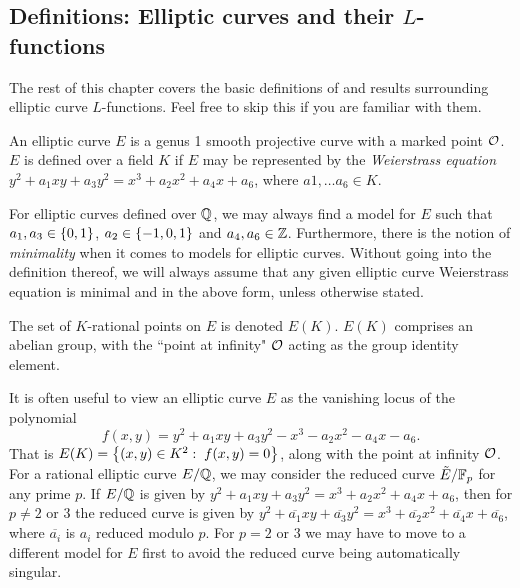 \documentclass[10pt]{article}
\begin{document}
\subsection{Definitions: Elliptic curves and their $L$-functions}

The rest of this chapter covers the basic definitions of and results surrounding elliptic curve $L$-functions. Feel free to skip this if you are familiar with them.

\begin{definition}
An elliptic curve $E$ is a genus 1 smooth projective curve with a marked point $\mathcal{O}$. $E$ is defined over a field $K$ if $E$ may be represented by the {\it Weierstrass equation} $y^2 + a_1 xy + a_3 y^2 = x^3 + a_2 x^2 + a_4 x + a_6$, where $a1,\ldots a_6 \in K$.
\end{definition}

For elliptic curves defined over $\mathbb{Q}$, we may always find a model for $E$ such that $a_1, a_3 \in \left\{0,1\right\}$, $a_2 \in \left\{-1,0,1\right\}$ and $a_4,a_6 \in \mathbb{Z}$. Furthermore, there is the notion of {\it minimality} when it comes to models for elliptic curves. Without going into the definition thereof, we will always assume that any given elliptic curve Weierstrass equation is minimal and in the above form, unless otherwise stated.

\begin{definition}
The set of $K$-rational points on $E$ is denoted $E(K)$. $E(K)$ comprises an abelian group, with the ``point at infinity" $\mathcal{O}$ acting as the group identity element.
\end{definition}

It is often useful to view an elliptic curve $E$ as the vanishing locus of the polynomial
\begin{equation}\label{eqn:E_poly}
f(x,y) = y^2 + a_1 xy + a_3 y^2 - x^3 - a_2 x^2 - a_4 x - a_6.
\end{equation}
 That is $E(K) = \left\{(x,y) \in K^2: \; f(x,y) = 0\right\}$, along with the point at infinity $\mathcal{O}$. \\

For a rational elliptic curve $E/\mathbb{Q}$, we may consider the reduced curve $\tilde{E}/\mathbb{F}_p$ for any prime $p$. If $E/\mathbb{Q}$ is given by $y^2 + a_1 xy + a_3 y^2 = x^3 + a_2 x^2 + a_4 x + a_6$, then for $p\ne 2$ or $3$ the reduced curve is given by $y^2 + \overline{a_1} xy + \overline{a_3} y^2 = x^3 + \overline{a_2} x^2 + \overline{a_4} x + \overline{a_6}$, where $\overline{a_i}$ is $a_i$ reduced modulo $p$. For $p = 2$ or $3$ we may have to move to a different model for $E$ first to avoid the reduced curve being automatically singular.
\end{document}
